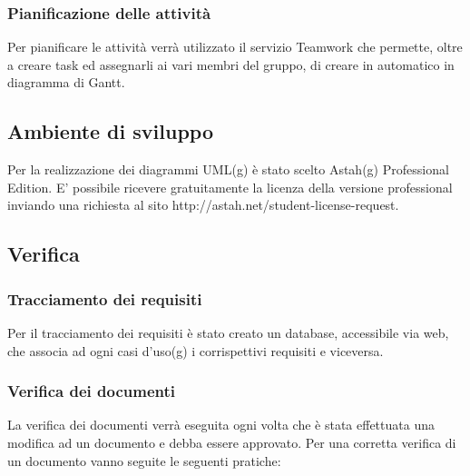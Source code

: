 \subsubsection{Pianificazione delle attività}

Per pianificare le attività verrà utilizzato il servizio Teamwork che permette, oltre a creare task ed assegnarli ai vari membri del gruppo, di creare in automatico in diagramma di Gantt.

\subsection{Ambiente di sviluppo}



Per la realizzazione dei diagrammi UML(g) è stato scelto Astah(g) Professional Edition.
E' possibile ricevere gratuitamente la licenza della versione professional inviando una richiesta al sito http://astah.net/student-license-request.

\subsection{Verifica}

\subsubsection{Tracciamento dei requisiti}

Per il tracciamento dei requisiti è stato creato un database, accessibile via web, che associa ad ogni casi d'uso(g) i corrispettivi requisiti e viceversa.

\subsubsection{Verifica dei documenti}

La verifica dei documenti verrà eseguita ogni volta che è stata effettuata una modifica ad un documento e debba essere approvato.
Per una corretta verifica di un documento vanno seguite le seguenti pratiche:

